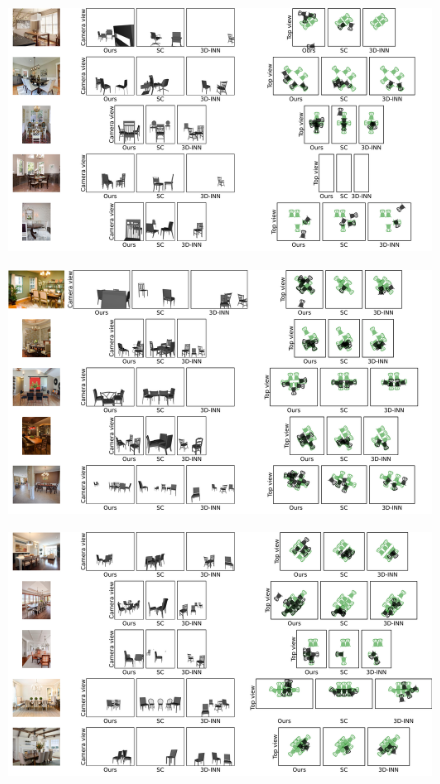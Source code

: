 \begin{figure}
    \includegraphics[width=\textwidth]{figures/qualitative_results/full/qual_results_18.pdf}
\end{figure}
\begin{figure}
    \includegraphics[width=\textwidth]{figures/qualitative_results/full/qual_results_19.pdf}
\end{figure}
\begin{figure}
    \includegraphics[width=\textwidth]{figures/qualitative_results/full/qual_results_20.pdf}
\end{figure}
